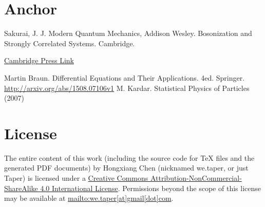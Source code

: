 \documentclass{article}
\numberwithin{equation}{subsection} %
\theoremstyle{definition}
\begin{document}

\section{Anchor}
\begin{thebibliography}{1}
	 Sakurai, J. J. Modern Quantum Mechanics, Addison Wesley.
	 Bosonization and Strongly Correlated Systems. Cambridge.

        \href{http://www.cambridge.org/us/academic/subjects/physics/condensed-matter-physics-nanoscience-and-mesoscopic-physics/bosonization-and-strongly-correlated-systems}{Cambridge Press Link}

     Martin Braun. Differential Equations and Their
    Applications. 4ed. Springer.
     \url{http://arxiv.org/abs/1508.07106v1}
     M. Kardar. Statistical Physics of Particles (2007)
\end{thebibliography}
\section{License}
The entire content of this work (including the source code
for TeX files and the generated PDF documents) by 
Hongxiang Chen (nicknamed we.taper, or just Taper) is
licensed under a 
\href{http://creativecommons.org/licenses/by-nc-sa/4.0/}{Creative 
Commons Attribution-NonCommercial-ShareAlike 4.0 International 
License}. Permissions beyond the scope of this 
license may be available at \url{mailto:we.taper[at]gmail[dot]com}.
\end{document}
